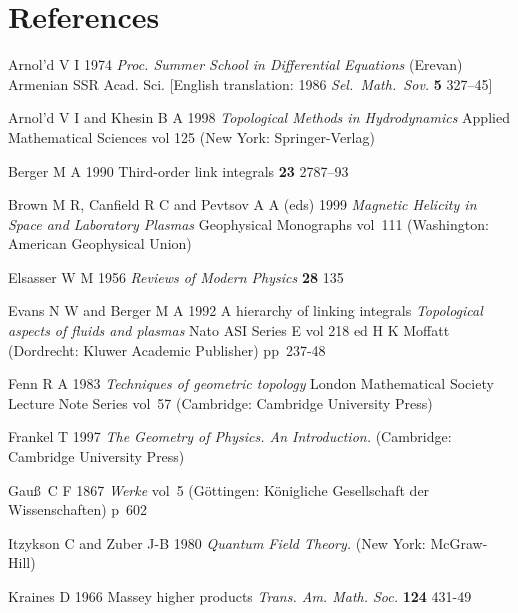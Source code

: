 \documentclass[10pt]{iopart}
\begin{document}
\section*{References}
\begin{harvard}

\item[] Arnol'd V I 1974 {\it Proc. Summer School in Differential
    Equations} (Erevan) Armenian SSR Acad. Sci. 
    [English translation: 1986 {\it Sel.~Math.~Sov.} {\bf 5} 327--45]

\item[] Arnol'd V I and Khesin B A 1998
  {\it Topological Methods in Hydrodynamics}
  Applied Mathematical Sciences vol 125 
  (New York: Springer-Verlag)


\item[] Berger M A 1990  Third-order link integrals 
  \JPA %
  {\bf 23} 2787--93


\item[] Brown M R, Canfield R C and Pevtsov A A (eds)  1999
  {\it Magnetic Helicity in Space and Laboratory Plasmas}
  Geophysical Monographs vol~111
  (Washington: American Geophysical Union)

\item[] Elsasser W M  1956 {\it Reviews of Modern Physics} {\bf 28} 135 

\item[] Evans N W and  Berger M A 1992
  A hierarchy of linking integrals 
  {\it Topological aspects of fluids and plasmas}
  Nato ASI Series E vol 218 
  ed H K Moffatt \etal 
  (Dordrecht: Kluwer Academic Publisher) pp~237-48

\item[] Fenn R A  1983  
  {\it Techniques of geometric topology}
  London Mathematical Society Lecture Note Series vol~57
  (Cambridge: Cambridge University Press)

\item[] Frankel T 1997
  {\it The Geometry of Physics. An Introduction.}
  (Cambridge: Cambridge University Press)


\item[] Gau\ss~C F 1867 {\it Werke} vol~5 (G\"{o}ttingen: K\"{o}nigliche
    Gesellschaft der Wissenschaften) p~602 

\item[] Itzykson C and  Zuber J-B 1980
  {\it Quantum Field Theory.}
  (New York: McGraw-Hill)


\item[] Kraines D 1966 Massey higher products 
  {\it Trans. Am. Math. Soc.} {\bf 124} 431-49


\end{harvard}
\end{document}
